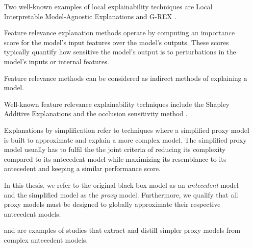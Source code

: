 \begin{remark}
  Two well-known examples of local explainability techniques are Local
  Interpretable Model-Agnostic Explanations \citep{lime} and G-REX
  \citep{konig2008g}.
\end{remark}

\begin{definition}
  Feature relevance explanation methods operate by computing an importance score
  for the model's input features over the model's outputs. These
  scores typically quantify how sensitive the model's output is to perturbations
  in the model's inputs or internal features.
\end{definition}

\begin{remark}
  \label{rmk:feature_relevance_indirect}
  Feature relevance methods can be considered as indirect methods of explaining
  a model.
\end{remark}

\begin{remark}
  Well-known feature relevance explainability techniques include the Shapley
  Additive Explanations \citep{lundberg2017unified} and the occlusion
  sensitivity method \citep{zeiler2014visualizing}.
\end{remark}

\begin{definition}
  \label{def:explain_simplify}
  Explanations by simplification refer to techniques where a simplified proxy
  model is built to approximate and explain a more complex model. The simplified
  proxy model usually has to fulfil the the joint criteria of reducing its
  complexity compared to its antecedent model while maximizing its resemblance
  to its antecedent and keeping a similar performance score.
\end{definition}

\begin{remark}
  In this thesis, we refer to the original black-box model as an
  \textit{antecedent} model and the simplified model as the \textit{proxy}
  model. Furthermore, we qualify that all proxy models must be designed to
  globally approximate their respective antecedent models.
\end{remark}

\begin{remark}
  \citet{bastani2017interpretability} and \citet{tan2018distill} are examples of
  studies that extract and distill simpler proxy models from complex antecedent
  models.
\end{remark}

